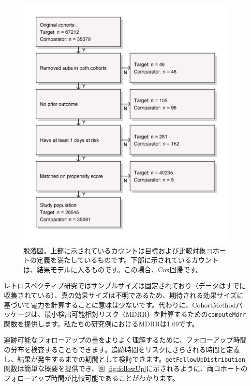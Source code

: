 \documentclass[
  11pt]{book}
\theoremstyle{definition}
\theoremstyle{definition}
\theoremstyle{definition}
\theoremstyle{definition}
\theoremstyle{remark}
\begin{document}
\begin{figure}

{\centering \includegraphics[width=0.7\linewidth]{images/PopulationLevelEstimation/attrition} 

}

\caption{脱落図。上部に示されているカウントは目標および比較対象コホートの定義を満たしているものです。下部に示されているカウントは、結果モデルに入るものです。この場合、Cox回帰です。}\label{fig:attrition}
\end{figure}

レトロスペクティブ研究ではサンプルサイズは固定されており（データはすでに収集されている）、真の効果サイズは不明であるため、期待される効果サイズに基づいて電力を計算することに意味は少ないです。代わりに、CohortMethodパッケージは、最小検出可能相対リスク（MDRR）を計算するための\texttt{computeMdrr}関数を提供します。私たちの研究例におけるMDRRは1.69です。  

追跡可能なフォローアップの量をよりよく理解するために、フォローアップ時間の分布を検査することもできます。追跡時間をリスクにさらされる時間と定義し、結果が発生するまでの期間として検討できます。\texttt{getFollowUpDistribution}関数は簡単な概要を提供でき、図 \ref{fig:followUp}に示されるように、両コホートのフォローアップ時間が比較可能であることがわかります。
\end{document}
